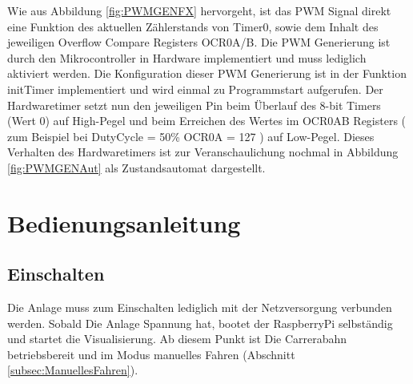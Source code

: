 \documentclass[a4paper, 11pt]{report}
\begin{document}
Wie aus Abbildung \ref{fig:PWMGENFX} hervorgeht, ist das PWM Signal direkt eine Funktion des aktuellen Zählerstands von Timer0, sowie dem Inhalt des jeweiligen Overflow Compare Registers OCR0A/B.
Die PWM Generierung ist durch den Mikrocontroller in Hardware implementiert und muss lediglich aktiviert werden. Die Konfiguration dieser PWM Generierung ist in der Funktion initTimer implementiert und wird einmal zu Programmstart aufgerufen. Der Hardwaretimer setzt nun den jeweiligen Pin beim Überlauf des 8-bit Timers (Wert 0) auf High-Pegel und beim Erreichen des Wertes im OCR0AB Registers ( zum Beispiel  bei DutyCycle = 50\% OCR0A = 127 ) auf Low-Pegel.
Dieses Verhalten des Hardwaretimers ist zur Veranschaulichung nochmal in Abbildung  \ref{fig:PWMGENAut} als Zustandsautomat dargestellt.


\chapter{Bedienungsanleitung}
\section{Einschalten}
	Die Anlage muss zum Einschalten lediglich mit der Netzversorgung verbunden werden. Sobald Die Anlage Spannung hat, bootet der RaspberryPi selbständig und startet die Visualisierung. Ab diesem Punkt ist Die Carrerabahn betriebsbereit und im Modus manuelles Fahren (Abschnitt \ref{subsec:ManuellesFahren}).
\end{document}

